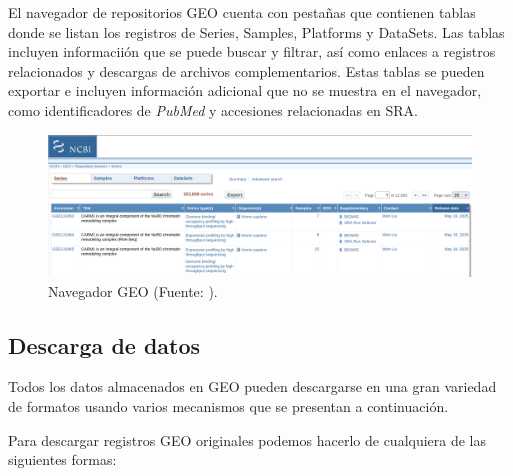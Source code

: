 El navegador de repositorios GEO cuenta con pestañas que contienen tablas donde se listan los registros de Series, Samples, Platforms y DataSets. Las tablas incluyen informaciión que se 
puede buscar y filtrar, así como enlaces a registros relacionados y descargas de archivos complementarios. Estas tablas se pueden exportar e incluyen información adicional que no se muestra
en el navegador, como identificadores de \textit{PubMed} y accesiones relacionadas en SRA.

\begin{figure}[h]
    \centering
    \includegraphics[width=1\textwidth]{../img/geo-browser.png}
    \caption{Navegador GEO (Fuente: \cite{geo-browse}).}
\end{figure}

\subsection{Descarga de datos}

Todos los datos almacenados en GEO pueden descargarse en una gran variedad de formatos usando varios mecanismos que se presentan a continuación.

Para descargar registros GEO originales podemos hacerlo de cualquiera de las siguientes formas:

